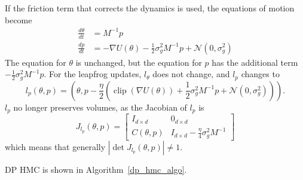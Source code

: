 \documentclass[english,twoside,openright]{HYgraduMLDS}
\newcommand{\caln}{{\mathcal{N}}}
\DeclareMathOperator{\clip}{clip}
\begin{document}
If the friction term that corrects the dynamics is used, the equations of
motion become~\cite{CFG14}
\begin{align*}
  \frac{d\theta}{dt} &= M^{-1}p \\
  \frac{dp}{dt} &= -\nabla U(\theta) - \frac{1}{2}\sigma_{g}^{2}M^{-1}p + \caln(0, \sigma_{g}^{2})
\end{align*}
The equation for \(\theta\) is unchanged, but the equation for \(p\) has the
additional term \(-\frac{1}{2}\sigma_{g}^{2}M^{-1}p\).
For the leapfrog updates, \(l_{\theta}\) does not change, and \(l_{p}\) changes
to
\[
  l_{p}(\theta, p) = \left(\theta, p - \frac{\eta}{2}(\clip(\nabla U(\theta))
  + \frac{1}{2}\sigma_{g}^{2}M^{-1}p + \caln(0, \sigma_{g}^{2}))\right).
\]
\(l_{p}\) no longer preserves volumes, as the Jacobian of \(l_{p}\) is
\[
  J_{l_{p}}(\theta, p) =
  \begin{bmatrix}
    I_{d\times d} & 0_{d\times d} \\
    C(\theta, p) & I_{d\times d} - \frac{\eta}{4}\sigma_{g}^{2}M^{-1}
  \end{bmatrix}
\]
which means that generally \(|\det J_{l_{p}}(\theta, p)| \neq 1\).

DP HMC is shown in Algorithm~\ref{dp_hmc_algo}.
\end{document}
